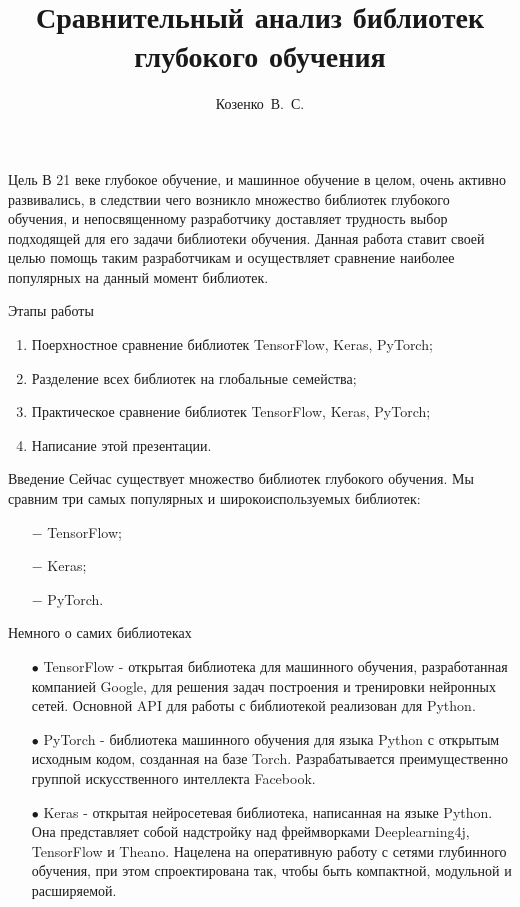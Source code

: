 \documentclass[aspectratio=169]{beamer}
\title{Сравнительный анализ библиотек глубокого обучения}
\author{Козенко~В.~С.}
\begin{document}

\begin{frame}
\titlepage
\end{frame}

\begin{frame}{Цель}
	В 21 веке глубокое обучение, и машинное обучение в целом, очень активно развивались, в следствии чего возникло множество библиотек глубокого обучения, и непосвященному разработчику доставляет трудность выбор подходящей для его задачи библиотеки обучения. Данная работа ставит своей целью помощь таким разработчикам и осуществляет сравнение наиболее популярных на данный момент библиотек.
\end{frame}

\begin{frame}{Этапы работы}
	\begin{enumerate}
		\item Поерхностное сравнение библиотек TensorFlow, Keras, PyTorch;
		\item Разделение всех библиотек на глобальные семейства;
		\item Практическое сравнение библиотек TensorFlow, Keras, PyTorch;
		\item Написание этой презентации.
	\end{enumerate}	
\end{frame}

\begin{frame}{Введение}
Сейчас существует множество библиотек глубокого обучения. Мы сравним три самых популярных и широкоиспользуемых библиотек: 
\begin{itemize}
	\item[$-$]TensorFlow;
	\item[$-$]Keras;
	\item[$-$]PyTorch.
\end{itemize}
\end{frame}

\begin{frame}{Немного о самих библиотеках}
\begin{itemize}
\item[$\bullet$] TensorFlow - открытая библиотека для машинного обучения, разработанная компанией Google, для решения задач построения и тренировки нейронных сетей. Основной API для работы с библиотекой реализован для Python.

\item[$\bullet$] PyTorch - библиотека машинного обучения для языка Python с открытым исходным кодом, созданная на базе Torch. Разрабатывается преимущественно группой искусственного интеллекта Facebook.

\item[$\bullet$] Keras - открытая нейросетевая библиотека, написанная на языке Python. Она представляет собой надстройку над фреймворками Deeplearning4j, TensorFlow и Theano. Нацелена на оперативную работу с сетями глубинного обучения, при этом спроектирована так, чтобы быть компактной, модульной и расширяемой.
\end{itemize}
\end{frame}
\end{document}
